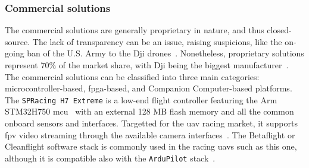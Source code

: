 \subsubsection{Commercial solutions}%
\label{sec:commercial-solutions-hw}
The commercial solutions are generally proprietary in nature, and thus closed-source. The
lack of transparency can be an issue, raising suspicions, like the on-going ban
of the U.S. Army to the Dji
drones~\cite{suasNewsDjiDronesBanned2017,djiBan2022}. Nonetheless, proprietary
solutions represent 70\% of the market share, with Dji being the biggest
manufacturer~\cite{droneAnalyst2021}.
%
The commercial solutions can be classified into three main categories: microcontroller-based, \gls{fpga}-based, and Companion Computer-based
platforms.
The \lstinline{SPRacing H7 Extreme} is a low-end flight controller featuring the
Arm STM32H750 \gls{mcu}~\cite{spRacing}
with an external 128 MB flash
memory and all the common onboard sensors and interfaces. Targetted for the \gls{uav} racing market, it supports \gls{fpv} video
streaming through the available camera interfaces~\cite{spRacing}. The
Betaflight or Cleanflight software stack is commonly used in the racing
\glspl{uav} such as this one, although it is compatible also with the \lstinline{ArduPilot} stack~\cite{arduPilot-SPRacing}.

%  

%

